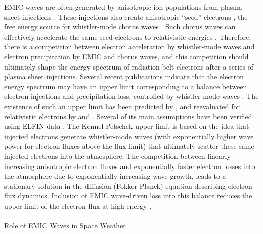 \documentclass[
  letterpaper,
  DIV=11,
  numbers=noendperiod]{scrartcl}
\makeatletter
\let\oldparagraph\paragraph
\renewcommand{\paragraph}{
    \@ifstar
      \xxxParagraphStar
      \xxxParagraphNoStar
  }
\newcommand{\xxxParagraphStar}[1]{\oldparagraph*{#1}\mbox{}}
\newcommand{\xxxParagraphNoStar}[1]{\oldparagraph{#1}\mbox{}}
\makeatother
\begin{document}
EMIC waves are often generated by anisotropic ion populations from plasma sheet injections \citep{Jun19:emic}. These injections also create anisotropic ``seed'' electrons \citep{Miyoshi13,Jaynes15:seedelectrons}, the free energy source for whistler-mode chorus waves \citep{Tao11,Fu14:radiation_belts,Zhang18:whistlers&injections}. Such chorus waves can effectively accelerate the same seed electrons to relativistic energies \citep{miyoshiRebuildingProcessOuter2003, thorneRapidLocalAcceleration2013, mourenasApproximateAnalyticalSolutions2014, allisonLocalHeatingRadiation2020}. Therefore, there is a competition between electron acceleration by whistler-mode waves \citep[supported by direct adiabatic heating during injections, see, e.g.][]{sorathiaModelingDepletionRecovery2018} and electron precipitation by EMIC and chorus waves, and this competition should ultimately shape the energy spectrum of radiation belt electrons after a series of plasma sheet injections. Several recent publications indicate that the electron energy spectrum may have an upper limit corresponding to a balance between electron injections and precipitation loss, controlled by whistler-mode waves \citep{oliferTaleTwoRadiation2021, oliferNaturalLimitSpectral2022}. The existence of such an upper limit has been predicted by \citet{kennelLimitStablyTrapped1966}, and reevaluated for relativistic electrons by \citet{summersLimitStablyTrapped2009} and \citet{summersLimitingEnergySpectrum2014}. Several of its main assumptions have been verified using ELFIN data \citep{mourenasCheckingKeyAssumptions2024}. The Kennel-Petschek upper limit is based on the idea that injected electrons generate whistler-mode waves (with exponentially higher wave power for electron fluxes above the flux limit) that ultimately scatter these same injected electrons into the atmosphere. The competition between linearly increasing anisotropic electron fluxes and exponentially faster electron losses into the atmosphere due to exponentially increasing wave growth, leads to a stationary solution in the diffusion (Fokker-Planck) equation describing electron flux dynamics. Inclusion of EMIC wave-driven loss into this balance reduces the upper limit of the electron flux at high energy \citep{mourenasExtremeEnergySpectra2022}.

\paragraph{Role of EMIC Waves in Space Weather}\label{role-of-emic-waves-in-space-weather}
\end{document}

